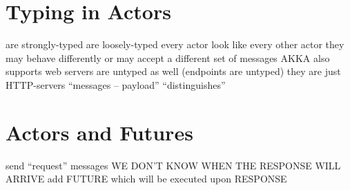 \documentclass{note}
\begin{document}
\section{Typing in Actors}
\bit
\w {} are strongly-typed
\w {} are loosely-typed
   \bit
   \w  every actor look like every other actor
   \w they may behave differently or may accept a different set of messages
   \w AKKA also supports 
   \eit
\w {}
   \bit
   \w web servers are untyped as well (endpoints are untyped)
   \w they are just HTTP-servers
   \w ``messages -- payload'' ``distinguishes''
   \eit
\eit

\section{Actors and Futures}
\bit
\w send ``request'' messages
\w WE DON'T KNOW WHEN THE RESPONSE WILL ARRIVE
\w add FUTURE which will be executed upon RESPONSE
\eit
\end{document}
